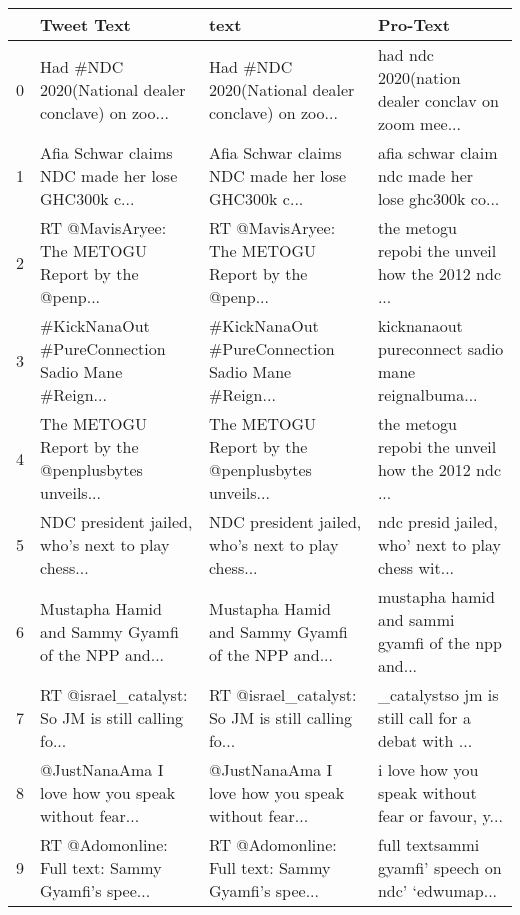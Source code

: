 \begin{tabular}{llll}
\toprule
{} &                                         Tweet Text &                                               text &                                           Pro-Text \\
\midrule
0 &  Had \#NDC 2020(National dealer conclave) on zoo... &  Had \#NDC 2020(National dealer conclave) on zoo... &  had ndc 2020(nation dealer conclav on zoom mee... \\
1 &  Afia Schwar claims NDC made her lose GHC300k c... &  Afia Schwar claims NDC made her lose GHC300k c... &  afia schwar claim ndc made her lose ghc300k co... \\
2 &  RT @MavisAryee: The METOGU Report by the @penp... &  RT @MavisAryee: The METOGU Report by the @penp... &  the metogu repobi the unveil how the 2012 ndc ... \\
3 &  \#KickNanaOut \#PureConnection Sadio Mane \#Reign... &  \#KickNanaOut \#PureConnection Sadio Mane \#Reign... &  kicknanaout pureconnect sadio mane reignalbuma... \\
4 &  The METOGU Report by the @penplusbytes unveils... &  The METOGU Report by the @penplusbytes unveils... &  the metogu repobi the unveil how the 2012 ndc ... \\
5 &  NDC president jailed, who’s next to play chess... &  NDC president jailed, who’s next to play chess... &  ndc presid jailed, who’ next to play chess wit... \\
6 &  Mustapha Hamid and Sammy Gyamfi of the NPP and... &  Mustapha Hamid and Sammy Gyamfi of the NPP and... &  mustapha hamid and sammi gyamfi of the npp and... \\
7 &  RT @israel\_catalyst: So JM is still calling fo... &  RT @israel\_catalyst: So JM is still calling fo... &  \_catalystso jm is still call for a debat with ... \\
8 &  @JustNanaAma I love how you speak without fear... &  @JustNanaAma I love how you speak without fear... &  i love how you speak without fear or favour, y... \\
9 &  RT @Adomonline: Full text: Sammy Gyamfi’s spee... &  RT @Adomonline: Full text: Sammy Gyamfi’s spee... &  full textsammi gyamfi’ speech on ndc’ ‘edwumap... \\
\bottomrule
\end{tabular}
